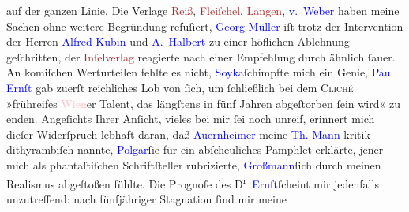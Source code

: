                     auf der ganzen Linie. Die Verlage \textcolor{brown}{Reiß}{}\ledrightnote{\textcolor{brown}{Erich Reiß}}, \textcolor{brown}{Fleiſchel}{}, \textcolor{brown}{Langen}{}\ledrightnote{\textcolor{brown}{Albert Langen}}, \textcolor{brown}{\textcolor{blue}{v. Weber}{}\ledrightnote{\textcolor{blue}{Hans von Weber}}}{} haben meine Sachen ohne weitere Begründung refuſiert, \textcolor{blue}{Georg Müller}{}\ledrightnote{\textcolor{blue}{Georg Müller}} iſt trotz der Intervention der Herren \textcolor{blue}{Alfred Kubin}{}\ledrightnote{\textcolor{blue}{Alfred Kubin}} und \textcolor{blue}{A. Halbert}{}\ledrightnote{\textcolor{blue}{Abraham Halbert}} zu einer höflichen Ablehnung geſchritten, der
                        \textcolor{brown}{Inſelverlag}{}\ledrightnote{\textcolor{brown}{Insel-Verlag}} reagierte nach einer Empfehlung
                    durch \label{K_L01946_2v}\label{K_L01946_2h}{ }{\pb}ähnlich ſauer. An komiſchen
                    Werturteilen fehlte es nicht, \textcolor{blue}{Soyka}{}\ledrightnote{\textcolor{blue}{Otto Soyka}}{ }ſchimpfte mich ein Genie, \textcolor{blue}{Paul Ernſt}{}\ledrightnote{\textcolor{blue}{Paul Ernst}} gab zuerſt reichliches Lob von ſich, um
                    ſchließlich bei dem \textsc{Cliché} »frühreifes \textcolor{pink}{Wien}{}\ledrightnote{\textcolor{pink}{Wien}}er Talent, das längſtens in fünf Jahren abgeſtorben
                    ſein wird« zu enden. Angeſichts Ihrer Anſicht, vieles bei mir ſei noch unreif,
                    erinnert mich dieſer Widerſpruch lebhaft daran, daß \textcolor{blue}{Auernheimer}{}\ledrightnote{\textcolor{blue}{Raoul Auernheimer}} meine \textcolor{blue}{Th.
                        Mann}{}\ledrightnote{\textcolor{blue}{Thomas Mann}}-kritik dithyrambiſch nannte, \textcolor{blue}{Polgar}{}\ledrightnote{\textcolor{blue}{Alfred Polgar}}{ }ſie für ein abſcheuliches Pamphlet erklärte,
                    jener mich als phantaſtiſchen Schriftſteller rubrizierte, \textcolor{blue}{Großmann}{}\ledrightnote{\textcolor{blue}{Stefan Großmann}}{ }ſich durch meinen Realismus abgeſtoßen fühlte.
                    Die Prognoſe des D\textsuperscript{r} \textcolor{blue}{Ernſt}{}\ledrightnote{\textcolor{blue}{Paul Ernst}}{ }ſcheint mir \introOben{}jedenfalls\introOben{} unzutreffend: nach fünfjähriger Stagnation ſind mir meine
